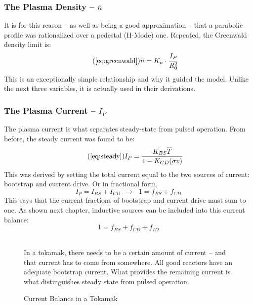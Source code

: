 \subsubsection{The Plasma Density -- $\overline n$}

 It is for this reason -- as well as being a good approximation -- that a parabolic profile was rationalized over a pedestal (H-Mode) one. Repeated, the Greenwald density limit is:
\begin{equation}
	\tag{\ref{eq:greenwald}}
	\overline n = K_n \cdot \frac{I_P}{R_0^2}
\end{equation}
This is an exceptionally simple relationship and why it guided the model. Unlike the next three variables, it is actually used in their derivations. 

\subsubsection{The Plasma Current -- $I_P$}

The plasma current is what separates steady-state from pulsed operation. From before, the steady current was found to be:
\begin{equation}
	\tag{\ref{eq:steady}}
	I_P = \frac{K_{BS} \overline T}{1 - K_{CD} ( \sigma v ) }
\end{equation}
This was derived by setting the total current equal to the two sources of current: bootstrap and current drive. Or in fractional form,
\begin{equation}
	I_P = I_{BS} + I_{CD} \ \ \rightarrow \, \ \ 1 = f_{BS} + f_{CD}
\end{equation}
This says that the current fractions of bootstrap and current drive must sum to one. As shown next chapter, inductive sources can be included into this current balance:
\begin{equation}
	\label{eq:ifbal}
	1 = f_{BS} + f_{CD} + f_{ID}
\end{equation}
\begin{figure}
	\centering
	\begin{adjustbox}{width=0.75\textwidth}
		
	\end{adjustbox}
	\caption{Current Balance in a Tokamak} ~\\
	\small In a tokamak, there needs to be a certain amount of current -- and that current has to come from somewhere. All good reactors have an adequate bootstrap current. What provides the remaining current is what distinguishes steady state from pulsed operation.
	\label{fig:curbal}
\end{figure}

